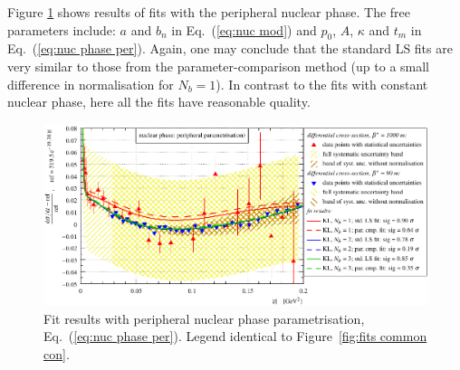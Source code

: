 Figure \ref{fig:fits common per} shows results of fits with the peripheral nuclear phase. The free parameters include: $a$ and $b_n$ in Eq.~(\ref{eq:nuc mod}) and $p_0$, $A$, $\kappa$ and $t_m$ in Eq.~(\ref{eq:nuc phase per}). Again, one may conclude that the standard LS fits are very similar to those from the parameter-comparison method (up to a small difference in normalisation for $N_b = 1$). In contrast to the fits with constant nuclear phase, here all the fits have reasonable quality.

\begin{figure}
\begin{center}
\includegraphics{fig/fits_common_per.pdf}
\caption{%
Fit results with peripheral nuclear phase parametrisation, Eq.~(\ref{eq:nuc phase per}). Legend identical to Figure~\ref{fig:fits common con}.
}
\label{fig:fits common per}
\end{center}
\end{figure}


